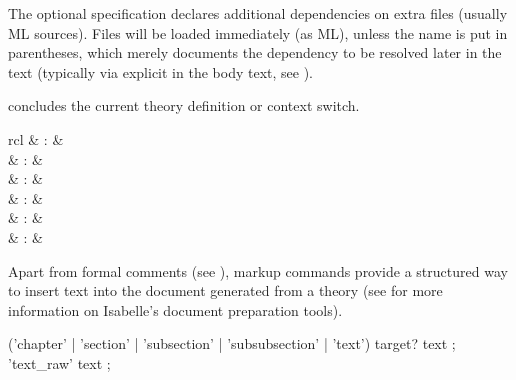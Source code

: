 \begin{isabellebody}
\begin{isamarkuptext}
\begin{descr}
  The optional \mbox{} specification declares additional
  dependencies on extra files (usually ML sources).  Files will be
  loaded immediately (as ML), unless the name is put in parentheses,
  which merely documents the dependency to be resolved later in the
  text (typically via explicit \mbox{} in the body text,
  see ).
  
  \item [\mbox{\isa{\isacommand{end}}}] concludes the current theory definition or
  context switch.

  \end{descr}%
\end{isamarkuptext}%
\isamarkuptrue%
%
\isamarkuptrue%
%
\begin{isamarkuptext}%
\begin{matharray}{rcl}
    \mbox{} & : &  \\
    \mbox{} & : &  \\
    \mbox{} & : &  \\
    \mbox{} & : &  \\
    \mbox{} & : &  \\
    \mbox{} & : &  \\
  \end{matharray}

  Apart from formal comments (see ), markup
  commands provide a structured way to insert text into the document
  generated from a theory (see \cite{isabelle-sys} for more
  information on Isabelle's document preparation tools).

  \begin{rail}
    ('chapter' | 'section' | 'subsection' | 'subsubsection' | 'text') target? text
    ;
    'text\_raw' text
    ;
  \end{rail}

  \begin{descr}


\end{descr}
\end{isamarkuptext}
\end{isabellebody}
